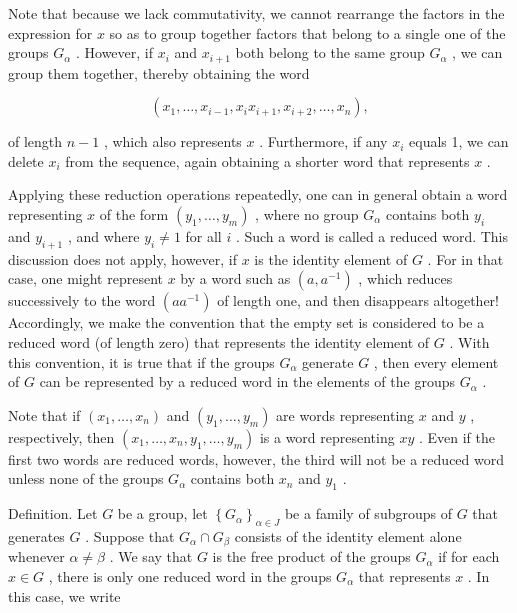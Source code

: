 Note that because we lack commutativity, we cannot rearrange the factors in the expression for \(x\) so as to group together factors that belong to a single one of the groups \({G}_{\alpha }\) . However, if \({x}_{i}\) and \({x}_{i + 1}\) both belong to the same group \({G}_{\alpha }\) , we can group them together, thereby obtaining the word

\[
\left( {{x}_{1},\ldots ,{x}_{i - 1},{x}_{i}{x}_{i + 1},{x}_{i + 2},\ldots ,{x}_{n}}\right) ,
\]

of length \(n - 1\) , which also represents \(x\) . Furthermore, if any \({x}_{i}\) equals 1, we can delete \({x}_{i}\) from the sequence, again obtaining a shorter word that represents \(x\) .

Applying these reduction operations repeatedly, one can in general obtain a word representing \(x\) of the form \(\left( {{y}_{1},\ldots ,{y}_{m}}\right)\) , where no group \({G}_{\alpha }\) contains both \({y}_{i}\) and \({y}_{i + 1}\) , and where \({y}_{i} \neq  1\) for all \(i\) . Such a word is called a reduced word. This discussion does not apply, however, if \(x\) is the identity element of \(G\) . For in that case, one might represent \(x\) by a word such as \(\left( {a,{a}^{-1}}\right)\) , which reduces successively to the word \(\left( {a{a}^{-1}}\right)\) of length one, and then disappears altogether! Accordingly, we make the convention that the empty set is considered to be a reduced word (of length zero) that represents the identity element of \(G\) . With this convention, it is true that if the groups \({G}_{\alpha }\) generate \(G\) , then every element of \(G\) can be represented by a reduced word in the elements of the groups \({G}_{\alpha }\) .

Note that if \(\left( {{x}_{1},\ldots ,{x}_{n}}\right)\) and \(\left( {{y}_{1},\ldots ,{y}_{m}}\right)\) are words representing \(x\) and \(y\) , respectively, then \(\left( {{x}_{1},\ldots ,{x}_{n},{y}_{1},\ldots ,{y}_{m}}\right)\) is a word representing \({xy}\) . Even if the first two words are reduced words, however, the third will not be a reduced word unless none of the groups \({G}_{\alpha }\) contains both \({x}_{n}\) and \({y}_{1}\) .

Definition. Let \(G\) be a group, let \({\left\{  {G}_{\alpha }\right\}  }_{\alpha  \in  J}\) be a family of subgroups of \(G\) that generates \(G\) . Suppose that \({G}_{\alpha } \cap  {G}_{\beta }\) consists of the identity element alone whenever \(\alpha  \neq  \beta\) . We say that \(G\) is the free product of the groups \({G}_{\alpha }\) if for each \(x \in  G\) , there is only one reduced word in the groups \({G}_{\alpha }\) that represents \(x\) . In this case, we write

